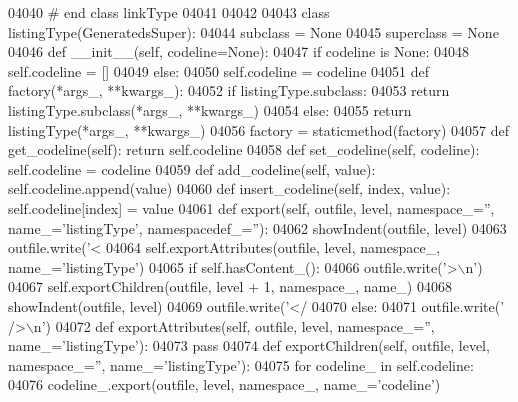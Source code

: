 \begin{DoxyCode}
{{{{{{{{{{{{{{{{{{{{{{{{{{{{{{{{{{{{{{{{{{{{{{{{{{{{{{{{{{{{{{{{{{{{{{{{{{{{{{{{{{{{{{{{{{{{{{{{{{{{{{{{{{{{{{{{{{{{{{{{{{{{{{{{{{{{{{{{{{{{{{{{{{{{{{{{{{{{{{{{{{{{{{{{{{{{{{{{{{{{{{{{{{{{{{{{{{{{{{{{{{{{{{{{{{{{{{{{{{{{{{{{{{{{{{{{{{{{{{{{{{{{{{{{{{{{{{{{{{{{{{{{{04040 \textcolor{comment}{# end class linkType}
04041 
04042 
04043 \textcolor{keyword}{class }listingType(GeneratedsSuper):
04044     subclass = \textcolor{keywordtype}{None}
04045     superclass = \textcolor{keywordtype}{None}
04046     \textcolor{keyword}{def }__init__(self, codeline=None):
04047         \textcolor{keywordflow}{if} codeline \textcolor{keywordflow}{is} \textcolor{keywordtype}{None}:
04048             self.codeline = []
04049         \textcolor{keywordflow}{else}:
04050             self.codeline = codeline
04051     \textcolor{keyword}{def }factory(*args\_, **kwargs\_):
04052         \textcolor{keywordflow}{if} listingType.subclass:
04053             \textcolor{keywordflow}{return} listingType.subclass(*args\_, **kwargs\_)
04054         \textcolor{keywordflow}{else}:
04055             \textcolor{keywordflow}{return} listingType(*args\_, **kwargs\_)
04056     factory = staticmethod(factory)
04057     \textcolor{keyword}{def }get_codeline(self): \textcolor{keywordflow}{return} self.codeline
04058     \textcolor{keyword}{def }set_codeline(self, codeline): self.codeline = codeline
04059     \textcolor{keyword}{def }add_codeline(self, value): self.codeline.append(value)
04060     \textcolor{keyword}{def }insert_codeline(self, index, value): self.codeline[index] = value
04061     \textcolor{keyword}{def }export(self, outfile, level, namespace\_='', name\_='listingType', namespacedef\_=''):
04062         showIndent(outfile, level)
04063         outfile.write(\textcolor{stringliteral}{'<%
04064         self.exportAttributes(outfile, level, namespace\_, name\_=\textcolor{stringliteral}{'listingType'})
04065         \textcolor{keywordflow}{if} self.hasContent_():
04066             outfile.write(\textcolor{stringliteral}{'>\(\backslash\)n'})
04067             self.exportChildren(outfile, level + 1, namespace\_, name\_)
04068             showIndent(outfile, level)
04069             outfile.write(\textcolor{stringliteral}{'</%
04070         \textcolor{keywordflow}{else}:
04071             outfile.write(\textcolor{stringliteral}{' />\(\backslash\)n'})
04072     \textcolor{keyword}{def }exportAttributes(self, outfile, level, namespace\_='', name\_='listingType'):
04073         \textcolor{keywordflow}{pass}
04074     \textcolor{keyword}{def }exportChildren(self, outfile, level, namespace\_='', name\_='listingType'):
04075         \textcolor{keywordflow}{for} codeline\_ \textcolor{keywordflow}{in} self.codeline:
04076             codeline\_.export(outfile, level, namespace\_, name\_=\textcolor{stringliteral}{'codeline'})
}}}}}}}}}}}}}}}}}}}}}}}}}}}}}}}}}}}}}}}}}}}}}}}}}}}}}}}}}}}}}}}}}}}}}}}}}}}}}}}}}}}}}}}}}}}}}}}}}}}}}}}}}}}}}}}}}}}}}}}}}}}}}}}}}}}}}}}}}}}}}}}}}}}}}}}}}}}}}}}}}}}}}}}}}}}}}}}}}}}}}}}}}}}}}}}}}}}}}}}}}}}}}}}}}}}}}}}}}}}}}}}}}}}}}}}}}}}}}}}}}}}}}}}}}}}}}}}}}}}}}}}}}}}
\end{DoxyCode}
